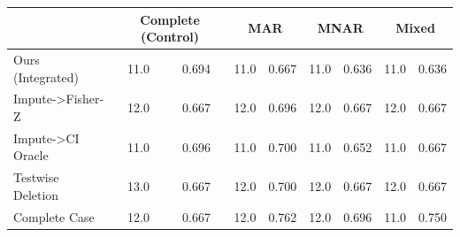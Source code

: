 \begin{tabular}{lcccccccc}
\toprule
 & \multicolumn{2}{c}{Complete (Control)} & \multicolumn{2}{c}{MAR} & \multicolumn{2}{c}{MNAR} & \multicolumn{2}{c}{Mixed} \\
\midrule
Ours (Integrated) & 11.0 & 0.694 & 11.0 & 0.667 & 11.0 & 0.636 & 11.0 & 0.636 \\
Impute->Fisher-Z & 12.0 & 0.667 & 12.0 & 0.696 & 12.0 & 0.667 & 12.0 & 0.667 \\
Impute->CI Oracle & 11.0 & 0.696 & 11.0 & 0.700 & 11.0 & 0.652 & 11.0 & 0.667 \\
Testwise Deletion & 13.0 & 0.667 & 12.0 & 0.700 & 12.0 & 0.667 & 12.0 & 0.667 \\
Complete Case & 12.0 & 0.667 & 12.0 & 0.762 & 12.0 & 0.696 & 11.0 & 0.750 \\
\bottomrule
\end{tabular}